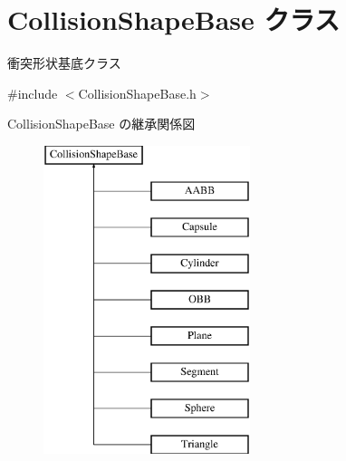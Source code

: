 \hypertarget{class_collision_shape_base}{}\section{Collision\+Shape\+Base クラス}
\label{class_collision_shape_base}


衝突形状基底クラス  




{\ttfamily \#include $<$Collision\+Shape\+Base.\+h$>$}

Collision\+Shape\+Base の継承関係図\begin{figure}[H]
\begin{center}
\leavevmode
\includegraphics[height=9.000000cm]{class_collision_shape_base}
\end{center}
\end{figure}
